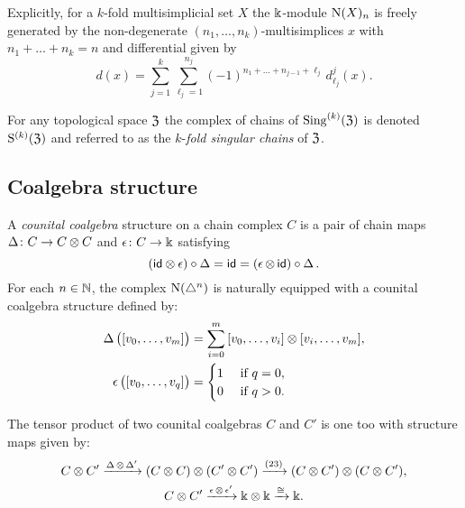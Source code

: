 Explicitly, for a $k$-fold multisimplicial set $X$ the $\Bbbk$-module $\operatorname{N}(X)_n$ is freely generated by the non-degenerate $(n_1, \dots, n_k)$-multisimplices $x$ with $n_1+\dots+n_k = n$ and differential given by
\[
d(x) = \sum_{j=1}^k \sum_{\ell_j=1}^{n_j}
(-1)^{n_{1}+\dots+n_{j-1}+\ell_j} \, d^j_{\ell_j}(x).
\]


For any topological space $\mathfrak{Z}$ the complex of chains of $\operatorname{Sing}^{(k)}(\mathfrak{Z})$ is denoted $\mathrm{S}^{(k)}(\mathfrak{Z})$ and referred to as the $k$-\textit{fold singular chains} of $\mathfrak{Z}$.

\subsection{Coalgebra structure} \label{ss:coalgebra}

A \textit{counital coalgebra} structure on a chain complex $C$ is a pair of chain maps $\operatorname{\Delta} \colon C \to C \otimes C$ and $\operatorname{\epsilon} \colon C \to \Bbbk$ satisfying
\[
(\mathsf{id} \otimes \operatorname{\epsilon}) \circ \operatorname{\Delta} =
\mathsf{id} =
(\operatorname{\epsilon} \otimes\, \mathsf{id}) \circ \operatorname{\Delta}.
\]
For each $n \in \mathbb{N}$, the complex $\operatorname{N}(\triangle^n)$ is naturally equipped with a counital coalgebra structure defined by:
\[
\begin{split}
	\operatorname{\Delta} \big( [v_0, \dots, v_m] \big) &=
	\sum_{i=0}^m \, [v_0, \dots, v_i] \otimes [v_i, \dots, v_m], \\
	\operatorname{\epsilon} \big( [v_0, \dots, v_q] \big) &=
	\begin{cases} 1 & \text{ if } q = 0, \\ 0 & \text{ if } q>0. \end{cases}
\end{split}
\]

The tensor product of two counital coalgebras $C$ and $C'$ is one too with structure maps given by:
\begin{gather*}
	C \otimes C^\prime \xrightarrow{\operatorname{\Delta} \otimes \operatorname{\Delta}^\prime}
	(C \otimes C) \otimes (C^\prime \otimes C^\prime) \xrightarrow{(23)}
	(C \otimes C^\prime) \otimes (C \otimes C^\prime), \\
	C \otimes C^\prime \xrightarrow{\operatorname{\epsilon} \otimes \operatorname{\epsilon}^\prime}
	\Bbbk \otimes \Bbbk \xrightarrow{\cong} \Bbbk.
\end{gather*}

